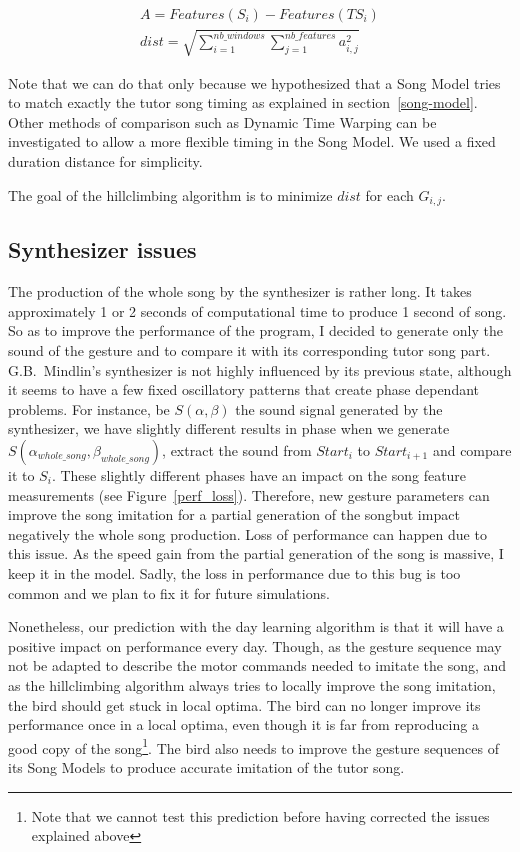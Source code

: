 \documentclass{report}
\begin{document}
\begin{eqnarray}
  A = Features(S_i) - Features(TS_i) \\
  dist = \sqrt{\sum_{i=1}^{nb\_windows} \sum_{j=1}^{nb\_features} a_{i,j}^2}
  \label{dist_eq}
\end{eqnarray}

Note that we can do that only because we hypothesized that a Song Model tries to
match exactly the tutor song timing as explained in section~\ref{song-model}.
Other methods of comparison such as Dynamic Time Warping can be investigated to
allow a more flexible timing in the Song Model. We used a fixed duration
distance for simplicity.

The goal of the hillclimbing algorithm is to minimize $dist$ for each $G_{i,j}$.

\subsection{Synthesizer issues}

The production of the whole song by the synthesizer is rather long. It takes
approximately 1 or 2 seconds of computational time to produce 1 second of song.
So as to improve the performance of the program, I decided to generate only the
sound of the gesture and to compare it with its corresponding tutor song part.
G.B.~Mindlin's synthesizer is not highly influenced by its previous state,
although it seems to have a few fixed oscillatory patterns that create phase
dependant problems. For instance, be $S(\alpha, \beta)$ the sound signal
generated by the synthesizer, we have slightly different results in phase when
we generate $S(\alpha_{whole\_song}, \beta_{whole\_song})$, extract the sound
from $Start_i$ to $Start_{i+1}$ and compare it to $S_i$. These slightly
different phases have an impact on the song feature measurements (see
Figure~\ref{perf_loss}). Therefore, new gesture parameters can improve the song
imitation for a partial generation of the songbut impact negatively the whole
song production. Loss of performance can happen due to this issue. As the speed
gain from the partial generation of the song is massive, I keep it in the model.
Sadly, the loss in performance due to this bug is too common and we plan to fix
it for future simulations.


Nonetheless, our prediction with the day learning algorithm is that it will have
a positive impact on performance every day. Though, as the gesture sequence may
not be adapted to describe the motor commands needed to imitate the song, and as
the hillclimbing algorithm always tries to locally improve the song imitation,
the bird should get stuck in local optima. The bird can no longer improve its
performance once in a local optima, even though it is far from reproducing a
good copy of the song\footnote{Note that we cannot test this prediction before
having corrected the issues explained above}. The bird also needs to improve
the gesture sequences of its Song Models to produce accurate imitation of the
tutor song.
\end{document}
